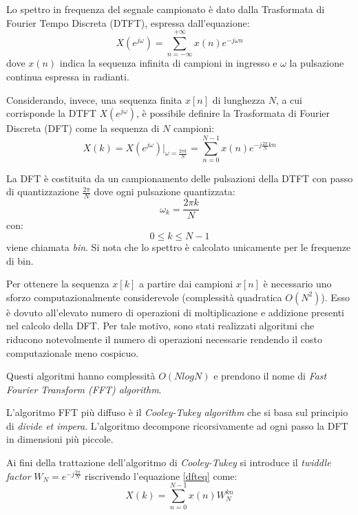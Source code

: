 Lo spettro in frequenza del segnale campionato è dato dalla Trasformata di Fourier Tempo Discreta (DTFT), espressa dall'equazione: 
\begin{equation}
	X(e^{j\omega}) = \sum_{n=-\infty}^{+\infty} x(n)e^{-j\omega n}
\end{equation}
dove $x(n)$ indica la sequenza infinita di campioni in ingresso e $\omega$ la pulsazione continua espressa in radianti.

Considerando, invece, una sequenza finita $x[n]$ di lunghezza $N$, a cui corrisponde la DTFT $X(e^{j\omega})$, è possibile definire la Trasformata di Fourier Discreta (DFT) come la sequenza di $N$ campioni:
\begin{equation}
	X(k)=X(e^{j\omega}) |_{\omega = \frac{2 \pi k}{N}} = \sum_{n=0}^{N-1} x(n)e^{-j \frac{2 \pi}{N} k n}
	\label{dfteq}
\end{equation}

La DFT è costituita da un campionamento delle pulsazioni della DTFT con passo di quantizzazione $\frac{2 \pi}{N}$ dove ogni pulsazione quantizzata:
\begin{equation}
	\omega _k = \frac{2 \pi k}{N} 
\end{equation}
con:
$$0 \leq k \leq N-1$$
viene chiamata \textit{bin}. Si nota che lo spettro è calcolato unicamente per le frequenze di bin.

Per ottenere la sequenza $x[k]$ a partire dai campioni $x[n]$ è necessario uno sforzo computazionalmente considerevole (complessità quadratica $O(N^2)$). Esso è dovuto all'elevato numero di operazioni di moltiplicazione e addizione presenti nel calcolo della DFT. Per tale motivo, sono stati realizzati algoritmi che riducono notevolmente il numero di operazioni necessarie rendendo il costo computazionale meno cospicuo.

Questi algoritmi hanno complessità $O(NlogN)$ e prendono il nome di 
\textit{Fast Fourier Transform (FFT) algorithm}.

L'algoritmo FFT più diffuso è il \textit{Cooley-Tukey algorithm} che si basa sul principio di \textit{divide et impera}. L'algoritmo decompone ricorsivamente ad ogni passo la DFT in dimensioni più piccole.

Ai fini della trattazione dell'algoritmo di \textit{Cooley-Tukey} si introduce il \textit{twiddle factor} $W_N = e^{-j \frac{2 \pi}{N}}$ riscrivendo l'equazione \ref{dfteq} come:
\begin{equation}
	X(k)=\sum_{n=0}^{N-1} x(n)W_N^{kn} 
	\label{dfteq2}
\end{equation}

